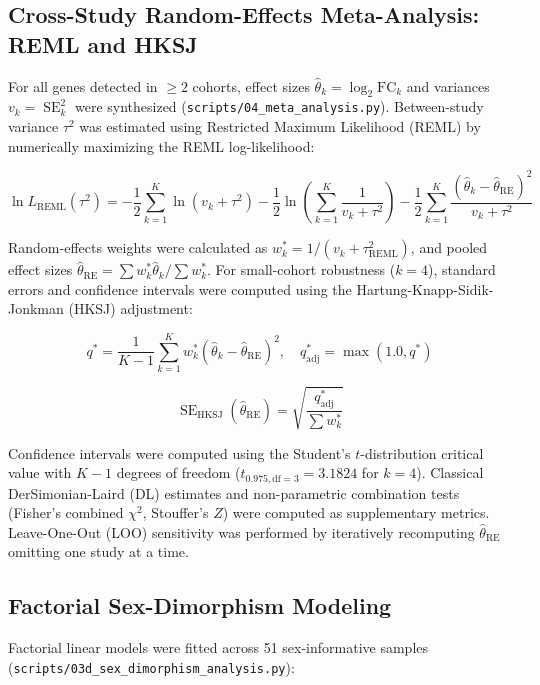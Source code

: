 \documentclass[10pt,a4paper]{article}
\begin{document}
\subsection{Cross-Study Random-Effects Meta-Analysis: REML and HKSJ}
For all genes detected in $\ge 2$ cohorts, effect sizes $\hat{\theta}_k = \log_2\text{FC}_k$ and variances $v_k = \operatorname{SE}_k^2$ were synthesized (\texttt{\small scripts/04\_meta\_analysis.py}). Between-study variance $\tau^2$ was estimated using Restricted Maximum Likelihood (REML) by numerically maximizing the REML log-likelihood:

\begin{equation}
\ln L_{\text{REML}}(\tau^2) = -\frac{1}{2}\sum_{k=1}^K \ln(v_k + \tau^2) - \frac{1}{2}\ln\left(\sum_{k=1}^K \frac{1}{v_k + \tau^2}\right) - \frac{1}{2}\sum_{k=1}^K \frac{(\hat{\theta}_k - \hat{\theta}_{\text{RE}})^2}{v_k + \tau^2}
\end{equation}

Random-effects weights were calculated as $w_k^* = 1 / (v_k + \tau^2_{\text{REML}})$, and pooled effect sizes $\hat{\theta}_{\text{RE}} = \sum w_k^* \hat{\theta}_k / \sum w_k^*$. For small-cohort robustness ($k=4$), standard errors and confidence intervals were computed using the Hartung-Knapp-Sidik-Jonkman (HKSJ) adjustment:

\begin{equation}
q^* = \frac{1}{K - 1}\sum_{k=1}^K w_k^* (\hat{\theta}_k - \hat{\theta}_{\text{RE}})^2, \quad q_{\text{adj}}^* = \max(1.0, q^*)
\end{equation}


\begin{equation}
\operatorname{SE}_{\text{HKSJ}}(\hat{\theta}_{\text{RE}}) = \sqrt{\frac{q_{\text{adj}}^*}{\sum w_k^*}}
\end{equation}

Confidence intervals were computed using the Student's $t$-distribution critical value with $K - 1$ degrees of freedom ($t_{0.975, \text{df}=3} = 3.1824$ for $k=4$). Classical DerSimonian-Laird (DL) estimates and non-parametric combination tests (Fisher's combined $\chi^2$, Stouffer's $Z$) were computed as supplementary metrics. Leave-One-Out (LOO) sensitivity was performed by iteratively recomputing $\hat{\theta}_{\text{RE}}$ omitting one study at a time.

\subsection{Factorial Sex-Dimorphism Modeling}
Factorial linear models were fitted across 51 sex-informative samples (\texttt{\small scripts/03d\_sex\_dimorphism\_analysis.py}):
\end{document}
